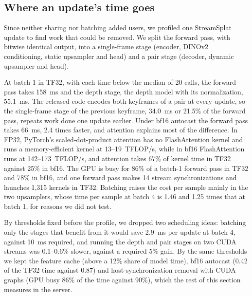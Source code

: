 \subsection{Where an update's time goes}

Since neither sharing nor batching added users, we profiled one StreamSplat update to find work that could be removed. %
We split the forward pass, with bitwise identical output, into a single-frame stage (encoder, DINOv2 conditioning, static upsampler and head) and a pair stage (decoder, dynamic upsampler and head). %

At batch 1 in TF32, with each time below the median of 20 calls, the forward pass takes 158~ms and the depth stage, the depth model with its normalization, 55.1~ms. %
The released code encodes both keyframes of a pair at every update, so the single-frame stage of the previous keyframe, 34.0~ms or 21.5\% of the forward pass, repeats work done one update earlier. %
Under bf16 autocast the forward pass takes 66~ms, 2.4 times faster, and attention explains most of the difference. %
In FP32, PyTorch's scaled-dot-product attention has no FlashAttention kernel and runs a memory-efficient kernel at 13--19~TFLOP/s, while in bf16 FlashAttention runs at 142--173~TFLOP/s, and attention takes 67\% of kernel time in TF32 against 25\% in bf16. %
The GPU is busy for 86\% of a batch-1 forward pass in TF32 and 78\% in bf16, and one forward pass makes 14 stream synchronizations and launches 1,315 kernels in TF32. %
Batching raises the cost per sample mainly in the two upsamplers, whose time per sample at batch 4 is 1.46 and 1.25 times that at batch 1, for reasons we did not test. %

By thresholds fixed before the profile, we dropped two scheduling ideas: batching only the stages that benefit from it would save 2.9~ms per update at batch 4, against 10~ms required, and running the depth and pair stages on two CUDA streams was 0.1--0.6\% slower, against a required 5\% gain. %
By the same thresholds we kept the feature cache (above a 12\% share of model time), bf16 autocast (0.42 of the TF32 time against 0.87) and host-synchronization removal with CUDA graphs (GPU busy 86\% of the time against 90\%), which the rest of this section measures in the server. %
